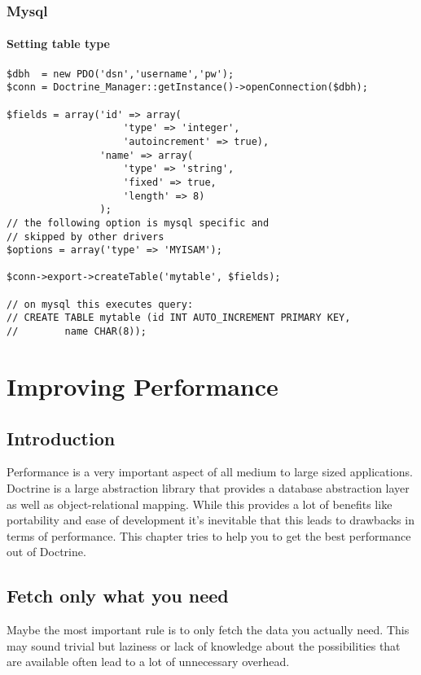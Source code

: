 \documentclass[11pt,a4paper]{report}
\begin{document}
\subsection{Mysql}
\subsubsection{Setting table type}
\begin{verbatim}
$dbh  = new PDO('dsn','username','pw');
$conn = Doctrine_Manager::getInstance()->openConnection($dbh);

$fields = array('id' => array(
                    'type' => 'integer',
                    'autoincrement' => true),
                'name' => array(
                    'type' => 'string',
                    'fixed' => true,
                    'length' => 8)
                );
// the following option is mysql specific and
// skipped by other drivers
$options = array('type' => 'MYISAM');

$conn->export->createTable('mytable', $fields);

// on mysql this executes query:
// CREATE TABLE mytable (id INT AUTO_INCREMENT PRIMARY KEY,
//        name CHAR(8));
\end{verbatim}

\chapter{Improving Performance}
\section{Introduction}
Performance is a very important aspect of all medium to large sized applications. Doctrine is a large\newline
abstraction  library that provides a database abstraction layer as well as object-relational mapping.\newline
While this provides a lot of benefits like portability and ease of development it's inevitable that this\newline
leads to drawbacks in terms of performance. This chapter tries to help you to get the best performance out of Doctrine.

\section{Fetch only what you need}
Maybe the most important rule is to only fetch the data you actually need. This may sound trivial but laziness or lack of knowledge about the possibilities that are available often lead to a lot of unnecessary overhead.
\end{document}
